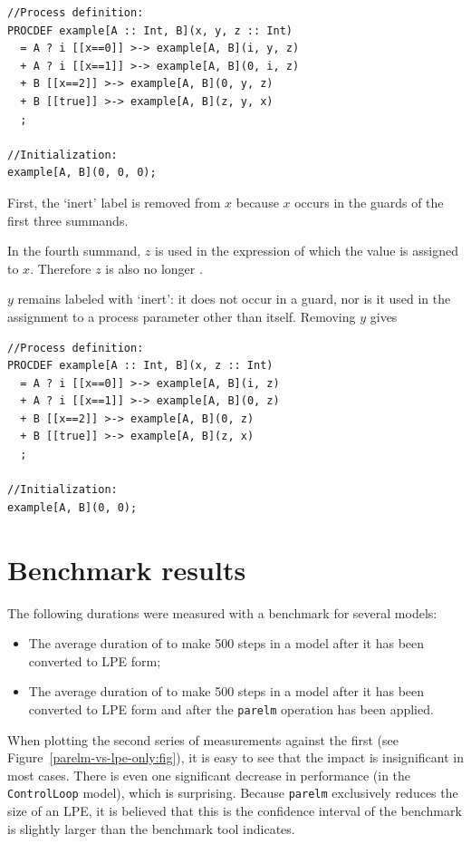 \begin{lstlisting}
//Process definition:
PROCDEF example[A :: Int, B](x, y, z :: Int)
  = A ? i [[x==0]] >-> example[A, B](i, y, z)
  + A ? i [[x==1]] >-> example[A, B](0, i, z)
  + B [[x==2]] >-> example[A, B](0, y, z)
  + B [[true]] >-> example[A, B](z, y, x)
  ;

//Initialization:
example[A, B](0, 0, 0);
\end{lstlisting}

First, the `inert' label is removed from $x$ because $x$ occurs in the guards of the first three summands.

In the fourth summand, $z$ is used in the expression of which the value is assigned to $x$.
Therefore $z$ is also no longer .

$y$ remains labeled with `inert': it does not occur in a guard, nor is it used in the assignment to a process parameter other than itself.
Removing $y$ gives

\begin{lstlisting}
//Process definition:
PROCDEF example[A :: Int, B](x, z :: Int)
  = A ? i [[x==0]] >-> example[A, B](i, z)
  + A ? i [[x==1]] >-> example[A, B](0, z)
  + B [[x==2]] >-> example[A, B](0, z)
  + B [[true]] >-> example[A, B](z, x)
  ;

//Initialization:
example[A, B](0, 0);
\end{lstlisting}

\section{Benchmark results}

The following durations were measured with a benchmark for several models:
\begin{itemize}
\item The average duration of \txs{} to make 500 steps in a model after it has been converted to LPE form;
\item The average duration of \txs{} to make 500 steps in a model after it has been converted to LPE form and after the \texttt{parelm} operation has been applied.
\end{itemize}

When plotting the second series of measurements against the first (see Figure~\ref{parelm-vs-lpe-only:fig}), it is easy to see that the impact is insignificant in most cases.
There is even one significant decrease in performance (in the \texttt{ControlLoop} model), which is surprising.
Because \texttt{parelm} exclusively reduces the size of an LPE, it is believed that this is the confidence interval of the benchmark is slightly larger than the benchmark tool indicates.

